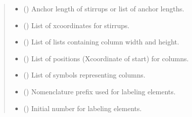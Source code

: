 \documentclass[a4paper,10pt,english]{sphinxmanual}
\begin{document}
\begin{fulllineitems}
\begin{quote}
\begin{description}
\begin{itemize}
\item {} 
\sphinxAtStartPar
{} (\sphinxstyleliteralemphasis{\sphinxupquote{ | }}) \textendash{} Anchor length of stirrups or list of anchor lengths.

\item {} 
\sphinxAtStartPar
{} () \textendash{} List of x\sphinxhyphen{}coordinates for stirrups.

\item {} 
\sphinxAtStartPar
{} (\sphinxstyleliteralemphasis{\sphinxupquote{{[}}}\sphinxstyleliteralemphasis{\sphinxupquote{{[}}}\sphinxstyleliteralemphasis{\sphinxupquote{, }}\sphinxstyleliteralemphasis{\sphinxupquote{{]}}}\sphinxstyleliteralemphasis{\sphinxupquote{{]}}}) \textendash{} List of lists containing column width and height.

\item {} 
\sphinxAtStartPar
{} (\sphinxstyleliteralemphasis{\sphinxupquote{{[}}}\sphinxstyleliteralemphasis{\sphinxupquote{{]}}}) \textendash{} List of positions (X\sphinxhyphen{}coordinate of start) for columns.

\item {} 
\sphinxAtStartPar
{} (\sphinxstyleliteralemphasis{\sphinxupquote{{[}}}\sphinxstyleliteralemphasis{\sphinxupquote{{]}}}) \textendash{} List of symbols representing columns.

\item {} 
\sphinxAtStartPar
{} () \textendash{} Nomenclature prefix used for labeling elements.

\item {} 
\sphinxAtStartPar
{} () \textendash{} Initial number for labeling elements.


\end{itemize}
\end{description}
\end{quote}
\end{fulllineitems}
\end{document}
